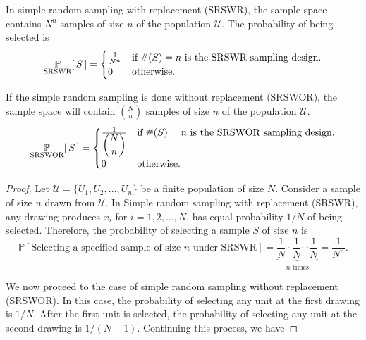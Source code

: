 \begin{theorem}
    In simple random sampling with replacement (SRSWR), the sample space
    contains $N^n$ samples of size $n$ of the population $\mathcal{U}$. 
    The probability of being selected is
    \begin{equation}
        \uprob[\text{SRSWR}]{S} = \begin{cases}
            \frac{1}{N^n} & \text{if } \hash(S)=n \text{ is the SRSWR sampling design.}\\
            0 & \text{otherwise}.
        \end{cases}
    \end{equation}

    If the simple random sampling is done without replacement (SRSWOR), the sample space 
    will contain ${ N \choose n }$ samples of size $n$ of the population $\mathcal{U}$. 
    \begin{equation}
        \uprob[\text{SRSWOR}]{S} = \begin{cases}
            \frac{1}{\displaystyle {N \choose n}} & \text{if } \hash(S)=n \text{ is the SRSWOR sampling design.}\\
            0 & \text{otherwise}.
        \end{cases}
    \end{equation}
\end{theorem}
\begin{proof}
    Let $\mathcal{U} = \{ U_1, U_2, \ldots, U_n \}$ be 
    a finite population of size $N$. 
    Consider a sample of size $n$ drawn from $\mathcal{U}$.
    In Simple random sampling with replacement (SRSWR), 
    any drawing produces $x_i$ for $i = 1, 2, \ldots, N$, has 
    equal probability $1/N$ of being selected.
    Therefore, the probability of selecting a sample $S$ of size $n$ is
    \begin{equation}
        \mathbb{P}[\text{Selecting a specified sample of size } n \text{ under SRSWR}] = \underbrace{\frac{1}{N} \cdot \frac{1}{N} \cdots \frac{1}{N}}_{n \text{ times}} = \frac{1}{N^n}.
    \end{equation}

    We now proceed to the case of simple random sampling without replacement (SRSWOR).
    In this case, the probability of selecting any unit at the 
    first drawing is $1/N$. After the first unit is selected, the probability of selecting any unit at the second drawing is $1/(N-1)$.
    Continuing this process, we have 
\end{proof}

